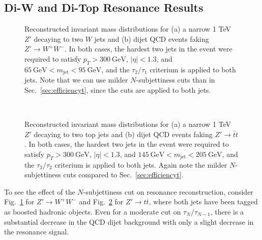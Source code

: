 \documentclass{JHEP3}
\newcommand{\vsh}{\vspace{-.5cm}}
\newcommand{\GeV}{\text{GeV}}
\DeclareRobustCommand{\Sec}[1]{Sec.~\ref{#1}}
\DeclareRobustCommand{\Fig}[1]{Fig.~\ref{#1}}
\begin{document}
\subsection{Di-W and Di-Top Resonance Results}
\label{sec:caseresults}

\begin{figure}[tp]
  \begin{center}
  \end{center}
    \vsh
    \caption{Reconstructed invariant mass distributions for (a) a narrow 1 TeV $Z'$ decaying to two $W$ jets and (b) dijet QCD events faking $Z' \rightarrow W^+W^-$.  In both cases, the hardest two jets in the event were required to satisfy $p_T > 300~\GeV$, $|\eta|<1.3$, and $65~\GeV < m_{\text{jet}} < 95~\GeV$, and the $\tau_2/\tau_1$ criterium is applied to both jets.  Note that we can use milder $N$-subjettiness cuts than in \Sec{sec:efficiencyt}, since the cuts are applied to both jets.}
    \label{fig:ZprimeInvM2}
\end{figure}

\begin{figure}[tp]
  \begin{center}
    \\
  \end{center}
  \vsh
    \caption{Reconstructed invariant mass distributions for (a) a narrow 1 TeV $Z'$ decaying to two top jets and (b) dijet QCD events faking $Z' \rightarrow \bar{t}t$.  In both cases, the hardest two jets in the event were required to satisfy $p_T > 300~\GeV$, $|\eta|<1.3$, and $145~\GeV < m_{\text{jet}} < 205~\GeV$, and the $\tau_3/\tau_2$ criterium is applied to both jets.  Again note the milder $N$-subjettiness cuts compared to \Sec{sec:efficiencyt}.}
    \label{fig:ZprimeInvM1}
\end{figure}

To see the effect of the $N$-subjettiness cut on resonance reconstruction, consider \Fig{fig:ZprimeInvM2} for $Z' \rightarrow W^+ W^-$ and \Fig{fig:ZprimeInvM1} for $Z' \rightarrow t \overline{t}$, where both jets have been tagged as boosted hadronic objects.  Even for a moderate cut on $\tau_{N}/\tau_{N-1}$, there is a substantial decrease in the QCD dijet background with only a slight decrease in the resonance signal.  
\end{document}
